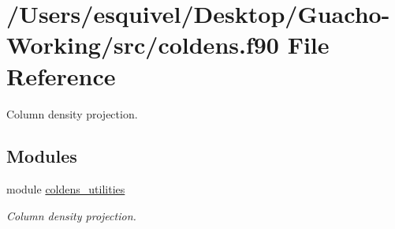 \hypertarget{coldens_8f90}{}\section{/\+Users/esquivel/\+Desktop/\+Guacho-\/\+Working/src/coldens.f90 File Reference}
\label{coldens_8f90}


Column density projection.  


\subsection*{Modules}
\begin{DoxyCompactItemize}
\item 
module \hyperlink{namespacecoldens__utilities}{coldens\+\_\+utilities}
\begin{DoxyCompactList}\small\item\em Column density projection. \end{DoxyCompactList}\end{DoxyCompactItemize}
